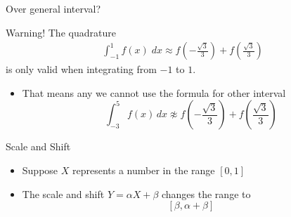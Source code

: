 \documentclass[10pt]{beamer}
\begin{document}
\begin{frame}{Over general interval?}
\begin{alertblock}{Warning!}
The quadrature     
\begin{eqnarray*}
  \int_{-1}^1 f(x) \; \mathit{dx} \approx f\left(-\frac{\sqrt{3}}{3}\right) + f\left(\frac{\sqrt{3}}{3} \right)
\end{eqnarray*}
is only valid when integrating from $-1$ to $1$. 
\end{alertblock}
\begin{itemize}
  \item That means any we cannot use the formula for other interval
  $$
    \int_{-3}^5 f(x)\,dx \not\approx  f\left(-\frac{\sqrt{3}}{3}\right) + f\left(\frac{\sqrt{3}}{3} \right)
  $$

\end{itemize}
\end{frame}
\begin{frame}{Scale and Shift}

\begin{itemize}
    \item Suppose $X$ represents a number in the range $[0,1]$

    \item The scale and shift $Y=\alpha X+\beta$ changes the range to 
    $$
        [\beta,\alpha+\beta]
    $$
    
\end{itemize}
\end{frame}
\end{document}
